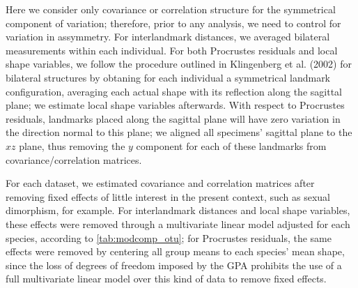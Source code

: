 \documentclass[11pt,twoside]{report}
\begin{document}
Here we consider only covariance or correlation structure for the
symmetrical component of variation; therefore, prior to any analysis, we
need to control for variation in assymmetry. For interlandmark
distances, we averaged bilateral measurements within each individual.
For both Procrustes residuals and local shape variables, we follow the
procedure outlined in Klingenberg et al. (2002) for bilateral structures
by obtaning for each individual a symmetrical landmark configuration,
averaging each actual shape with its reflection along the sagittal
plane; we estimate local shape variables afterwards. With respect to
Procrustes residuals, landmarks placed along the sagittal plane will
have zero variation in the direction normal to this plane; we aligned
all specimens' sagittal plane to the $xz$ plane, thus removing the $y$
component for each of these landmarks from covariance/correlation
matrices.

For each dataset, we estimated covariance and correlation matrices after
removing fixed effects of little interest in the present context, such
as sexual dimorphism, for example. For interlandmark distances and local
shape variables, these effects were removed through a multivariate
linear model adjusted for each species, according to
\autoref{tab:modcomp_otu}; for Procrustes residuals, the same effects
were removed by centering all group means to each species' mean shape,
since the loss of degrees of freedom imposed by the GPA prohibits the
use of a full multivariate linear model over this kind of data to remove
fixed effects.
\end{document}

